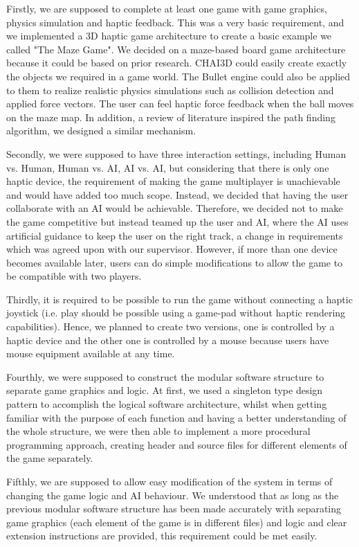 \documentclass[a4paper]{article}
\begin{document}
Firstly, we are supposed to complete at least one game with game graphics, physics simulation and haptic feedback. This was a very basic requirement, and we implemented a 3D haptic game architecture to create a basic example we called  "The Maze Game". We decided on a maze-based board game architecture because it could be based on prior research. CHAI3D could easily create exactly the objects we required in a game world. The Bullet engine could also be applied to them to realize realistic physics simulations such as collision detection and applied force vectors. The user can feel haptic force feedback when the ball moves on the maze map. In addition, a review of literature inspired the path finding algorithm, we designed a similar mechanism.

Secondly, we were supposed to have three interaction settings, including Human vs. Human, Human vs. AI, AI vs. AI, but considering that there is only one haptic device, the requirement of making the game multiplayer is unachievable and would have added too much scope. Instead, we decided that having the user collaborate with an AI would be achievable. Therefore, we decided not to make the game competitive but instead teamed up the user and AI, where the AI uses artificial guidance to keep the user on the right track, a change in requirements which was agreed upon with our supervisor. However, if more than one device becomes available later, users can do simple modifications to allow the game to be compatible with two players. 

Thirdly, it is required to be possible to run the game without connecting a haptic joystick (i.e. play should be possible using a game-pad without haptic rendering capabilities). Hence, we planned to create two versions, one is controlled by a haptic device and the other one is controlled by a mouse because users have mouse equipment available at any time.

Fourthly, we were supposed to construct the modular software structure to separate game graphics and logic. At first, we used a singleton type design pattern to accomplish the logical software architecture, whilst when getting familiar with the purpose of each function and having a better understanding of the whole structure, we were then able to implement a more procedural programming approach, creating header and source files for different elements of the game separately.

Fifthly, we are supposed to allow easy modification of the system in terms of changing the game logic and AI behaviour. We understood that as long as the previous modular software structure has been made accurately with separating game graphics (each element of the game is in different files) and logic and clear extension instructions are provided, this requirement could be met easily.
\end{document}
